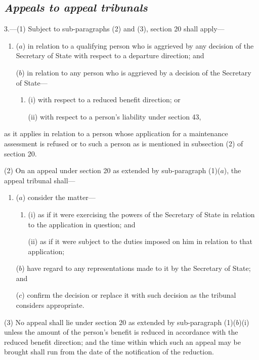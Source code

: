 \documentclass[12pt,a4paper]{article}
\begin{document}
\subsection*{\itshape Appeals to appeal tribunals}

3.---(1) Subject to sub-paragraphs (2) and (3), section 20 shall apply—
\begin{enumerate}\item[]
($a$) in relation to a qualifying person who is aggrieved by any decision of the Secretary of State with respect to a departure direction; and

($b$) in relation to any person who is aggrieved by a decision of the Secretary of State—
\begin{enumerate}\item[]
(i) with respect to a reduced benefit direction; or

(ii) with respect to a person’s liability under section 43,
\end{enumerate}
\end{enumerate}
as it applies in relation to a person whose application for a maintenance assessment is refused or to such a person as is mentioned in subsection (2) of section 20.

(2) On an appeal under section 20 as extended by sub-paragraph (1)($a$), the appeal tribunal shall—
\begin{enumerate}\item[]
($a$) consider the matter—
\begin{enumerate}\item[]
(i) as if it were exercising the powers of the Secretary of State in relation to the application in question; and

(ii) as if it were subject to the duties imposed on him in relation to that application;
\end{enumerate}

($b$) have regard to any representations made to it by the Secretary of State; and

($c$) confirm the decision or replace it with such decision as the tribunal considers appropriate.
\end{enumerate}

(3) No appeal shall lie under section 20 as extended by sub-paragraph (1)($b$)(i) unless the amount of the person’s benefit is reduced in accordance with the reduced benefit direction; and the time within which such an appeal may be brought shall run from the date of the notification of the reduction.
\end{document}

